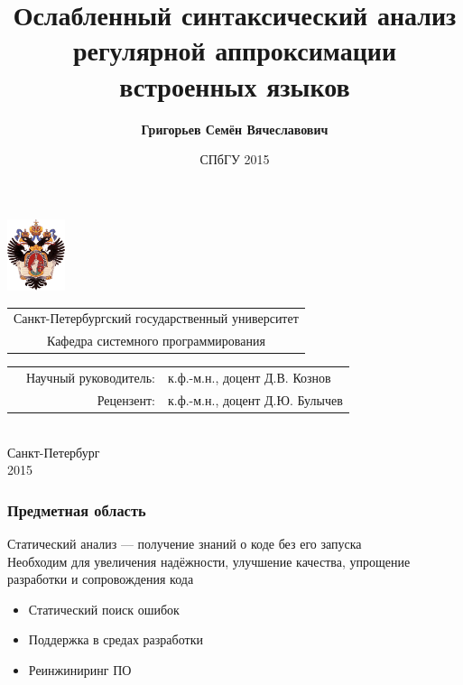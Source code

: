 \documentclass{beamer}
\title[]{Ослабленный синтаксический анализ регулярной аппроксимации встроенных языков}
\author[Григорьев Семён]{{\bfseries Григорьев Семён Вячеславович}}
\begin{document}
{

\begin{frame}
\includegraphics[width=1.7cm]{SPbGU_Logo.png}
\vspace{-40pt}
\hspace{-10pt}
\begin{center}
   \begin{tabular}{c}
        \scriptsize{Санкт-Петербургский государственный университет} \\
        \scriptsize{Кафедра системного программирования}
    \end{tabular}

\titlepage
\vspace{-10pt}
{\scriptsize
 {
 \begin{tabular} {p{3.5cm} r l} 
  &{Научный руководитель:}  & к.ф.-м.н., доцент Д.В. Кознов \\ 
  &{Рецензент:} & к.ф.-м.н., доцент Д.Ю. Булычев \\ 

 \end{tabular}
 }}
  \\
  \vspace{32pt}
  \scriptsize{Санкт-Петербург\\
                 2015}
  \end{center}
\end{frame}

\date{СПбГУ 2015}
}


\begin{frame}
    \transwipe[direction=90]
    \frametitle{Предметная область}
    Статический анализ --- получение знаний о коде без его запуска\\ \vspace{12pt}
    Необходим для увеличения надёжности, улучшение качества, упрощение разработки и сопровождения кода
    \begin{itemize}
        \item Статический поиск ошибок
        \item Поддержка в средах разработки
        \item Реинжиниринг ПО
    \end{itemize}
\end{frame}
\end{document}
